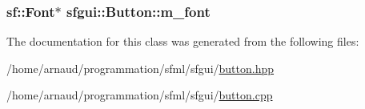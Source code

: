 \hypertarget{classsfgui_1_1Button_d3a2e16539c17bbbbaad6050a3a96de3}{
\subsubsection[m\_\-font]{\setlength{\rightskip}{0pt plus 5cm}sf::Font$\ast$ {\bf sfgui::Button::m\_\-font}}}
\label{classsfgui_1_1Button_d3a2e16539c17bbbbaad6050a3a96de3}




The documentation for this class was generated from the following files:\begin{CompactItemize}
\item 
/home/arnaud/programmation/sfml/sfgui/\hyperlink{button_8hpp}{button.hpp}\item 
/home/arnaud/programmation/sfml/sfgui/\hyperlink{button_8cpp}{button.cpp}\end{CompactItemize}
